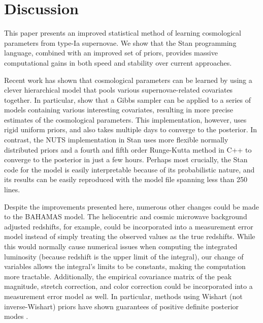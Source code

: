 \section{Discussion}
\label{sec:ode_discussion}

This paper presents an improved statistical method of learning cosmological parameters from type-Ia supernovae. We show that the Stan programming language, combined with an improved set of priors, provides massive computational gains in both speed and stability over current approaches.

Recent work has shown that cosmological parameters can be learned by using a clever hierarchical model that pools various supernovae-related covariates together. In particular, \citet{Shariff+others:2016} show that a Gibbs sampler can be applied to a series of models containing various interesting covariates, resulting in more precise estimates of the cosmological parameters. This implementation, however, uses rigid uniform priors, and also takes multiple days to converge to the posterior. In contrast, the NUTS implementation in Stan uses more flexible normally distributed priors and a fourth and fifth order Runge-Kutta method in C++ to converge to the posterior in just a few hours. Perhaps most crucially, the Stan code for the model is easily interpretable because of its probabilistic nature, and its results can be easily reproduced with the model file spanning less than 250 lines. 

Despite the improvements presented here, numerous other changes could be made to the BAHAMAS model. The heliocentric and cosmic microwave background adjusted redshifts, for example, could be incorporated into a measurement error model instead of simply treating the observed values as the true redshifts. While this would normally cause numerical issues when computing the integrated luminosity (because redshift is the upper limit of the integral), our change of variables allows the integral's limits to be constants, making the computation more tractable. Additionally, the empirical covariance matrix of the peak magnitude, stretch correction, and color correction could be incorporated into a measurement error model as well. In particular, methods using Wishart (not inverse-Wishart) priors have shown guarantees of positive definite posterior modes \citep{Chung+others:2015}.